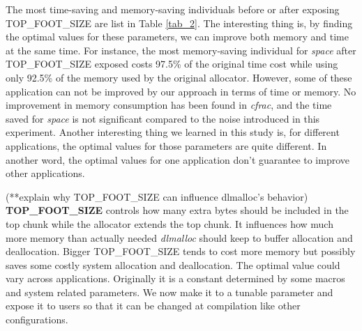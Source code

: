 The most time-saving and memory-saving individuals before or after exposing TOP\_FOOT\_SIZE are list in Table \ref{tab_2}. The interesting thing is, by finding the optimal values for these parameters, we can improve both memory and time at the same time. For instance, the most memory-saving individual for \emph{space} after TOP\_FOOT\_SIZE exposed costs 97.5\% of the original time cost while using only 92.5\% of the memory used by the original allocator. However, some of these application can not be improved by our approach in terms of time or memory. No improvement in memory consumption has been found in \emph{cfrac}, and the time saved for \emph{space} is not significant compared to the noise introduced in this experiment. Another interesting thing we learned in this study is, for different applications, the optimal values for those parameters are quite different. In another word, the optimal values for one application don't guarantee to improve other applications.

(**explain why TOP\_FOOT\_SIZE can influence dlmalloc's behavior)
\textbf{TOP\_FOOT\_SIZE} controls how many extra bytes should be included in the top chunk while the allocator extends the top chunk. It influences how much more memory than actually needed \emph{dlmalloc} should keep to buffer allocation and deallocation. Bigger TOP\_FOOT\_SIZE tends to cost more memory but possibly saves some costly system allocation and deallocation. The optimal value could vary across applications. Originally it is a constant determined by some macros and system related parameters. We now make it to a tunable parameter and expose it to users so that it can be changed at compilation like other configurations.
